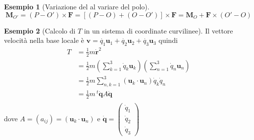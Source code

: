 \documentclass[a4paper,10pt]{article}
\theoremstyle{definition}
\newcommand{\bv}{\boldsymbol} %
\newcommand{\cvv}[3]{\begin{pmatrix} #1 \\ #2 \\ #3 \end{pmatrix}} %
\theoremstyle{indentdefinition}
\theoremstyle{indenttheorem}
\theoremstyle{myremark}
\newtheorem{example*}{Esempio}
\theoremstyle{indentgeneral}
\begin{document}
\begin{example*}[Variazione del  al variare del polo]
\[
\boldsymbol{M}_{O'}=\left(P-O'\right)\times\boldsymbol{F}=\left[\left(P-O\right)+\left(O-O'\right)\right]\times\boldsymbol{F}=\boldsymbol{M}_{O}+\boldsymbol{F}\times\left(O'-O\right)
\]
\end{example*}

\begin{example*}[Calcolo di $T$ in un sistema di coordinate curvilinee]
    Il vettore velocità nella base locale è ${\bv{v}}=\dot{q_1}\bv{u}_1+\dot{q_2}\bv{u}_2+\dot{q_3}\bv{u}_3$ quindi 
    \begin{align*}
        T &= \frac{1}{2}m\dot{\bv{r}}^2 \\
        &=\frac{1}{2}m(\sum_{k=1}^{3}\dot{q}_k\bv{u}_k)(\sum_{n=1}^{3}\dot{q}_n\bv{u}_n) \\
        &=\frac{1}{2}m\sum_{n,k=1}^{3}(\bv{u}_k\cdot\bv{u}_n)\dot{q}_k\dot{q}_n\\
        &=\frac{1}{2}m\,^t\dot{\bv{q}}A\dot{\bv{q}}\\
    \end{align*}
    dove $A=(a_{ij})=(\bv{u}_k\cdot\bv{u}_n)$ e $\dot{\bv{q}}=\cvv{\dot{q}_1}{\dot{q}_2}{\dot{q}_3}$
\end{example*}
\end{document}
